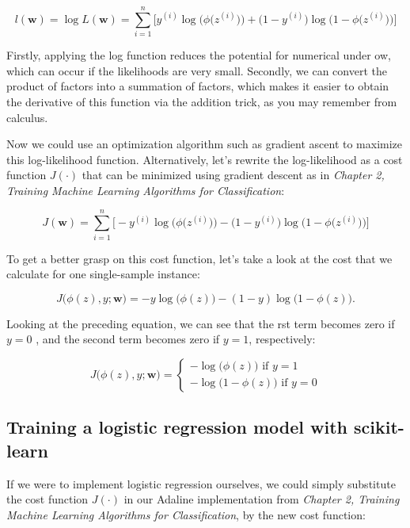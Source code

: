 \documentclass[letterpaper]{report}
\begin{document}
\[
l(\mathbf{w}) = \log L(\mathbf{w}) = \sum_{i=1}^{n} \Bigg[ y^{(i)} \log \bigg(\phi \big( z^{(i)} \big) \bigg) + \bigg(1 - y^{(i)} \bigg) \log \bigg( 1 - \phi \big( z^{(i)} \big) \bigg)  \Bigg]
\]

Firstly, applying the log function reduces the potential for numerical under ow, which can occur if the likelihoods are very small. Secondly, we can convert the product of factors into a summation of factors, which makes it easier to obtain the derivative of this function via the addition trick, as you may remember
from calculus.

Now we could use an optimization algorithm such as gradient ascent to maximize this log-likelihood function. Alternatively, let's rewrite the log-likelihood as a cost function $J(\cdot)$ that can be minimized using gradient descent as in \textit{Chapter 2, Training Machine Learning Algorithms for Classification}:

\[
J(\mathbf{w}) = \sum_{i=1}^{n} \Bigg[- y^{(i)} \log \bigg(\phi \big( z^{(i)} \big) \bigg) - \bigg(1 - y^{(i)} \bigg) \log \bigg( 1 - \phi \big( z^{(i)} \big) \bigg)  \Bigg]
\]

To get a better grasp on this cost function, let's take a look at the cost that we
calculate for one single-sample instance:

\[
J\big( \phi(z), y; \mathbf{w}   \big) = -y \log \big( \phi(z) \big) - (1-y) \log \big(1 - \phi(z) \big).
\]

Looking at the preceding equation, we can see that the  rst term becomes zero if
$y = 0$ , and the second term becomes zero if $y = 1$, respectively:


\[ 
J \big( \phi(z), y; \mathbf{w} \big)= \begin{cases} 
      - \log \big( \phi(z) \big) \text{ if } y=1\\
      - \log \big( 1 - \phi(z) \big)  \text{ if }  y=0
   \end{cases}
\]

\subsection{Training a logistic regression model with scikit-learn}

If we were to implement logistic regression ourselves, we could simply substitute the cost function $J(\cdot)$ in our Adaline implementation from \textit{Chapter 2, Training Machine Learning Algorithms for Classification}, by the new cost function:
\end{document}
